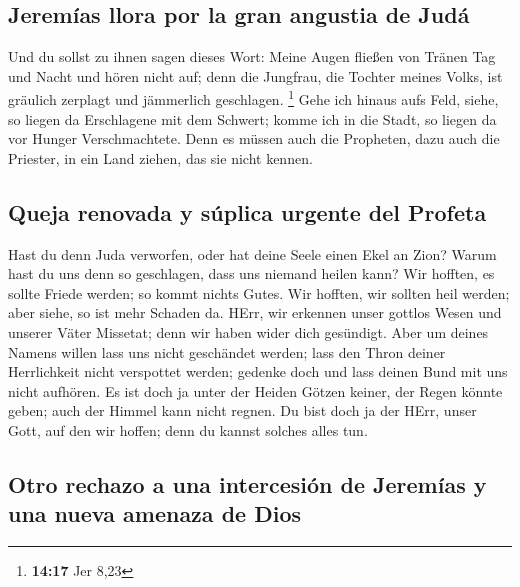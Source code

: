 \hypertarget{jeremuxedas-llora-por-la-gran-angustia-de-juduxe1}{%
\subsection{Jeremías llora por la gran angustia de
Judá}\label{jeremuxedas-llora-por-la-gran-angustia-de-juduxe1}}

 Und du sollst zu ihnen sagen dieses Wort: Meine Augen
fließen von Tränen Tag und Nacht und hören nicht auf; denn die Jungfrau,
die Tochter meines Volks, ist gräulich zerplagt und jämmerlich
geschlagen. \footnote{\textbf{14:17} Jer 8,23}  Gehe ich
hinaus aufs Feld, siehe, so liegen da Erschlagene mit dem Schwert; komme
ich in die Stadt, so liegen da vor Hunger Verschmachtete. Denn es müssen
auch die Propheten, dazu auch die Priester, in ein Land ziehen, das sie
nicht kennen.

\hypertarget{queja-renovada-y-suxfaplica-urgente-del-profeta}{%
\subsection{Queja renovada y súplica urgente del
Profeta}\label{queja-renovada-y-suxfaplica-urgente-del-profeta}}

 Hast du denn Juda verworfen, oder hat deine Seele einen
Ekel an Zion? Warum hast du uns denn so geschlagen, dass uns niemand
heilen kann? Wir hofften, es sollte Friede werden; so kommt nichts
Gutes. Wir hofften, wir sollten heil werden; aber siehe, so ist mehr
Schaden da.  HErr, wir erkennen unser gottlos Wesen und
unserer Väter Missetat; denn wir haben wider dich gesündigt.
 Aber um deines Namens willen lass uns nicht geschändet
werden; lass den Thron deiner Herrlichkeit nicht verspottet werden;
gedenke doch und lass deinen Bund mit uns nicht aufhören.
 Es ist doch ja unter der Heiden Götzen keiner, der Regen
könnte geben; auch der Himmel kann nicht regnen. Du bist doch ja der
HErr, unser Gott, auf den wir hoffen; denn du kannst solches alles tun.

\hypertarget{otro-rechazo-a-una-intercesiuxf3n-de-jeremuxedas-y-una-nueva-amenaza-de-dios}{%
\subsection{Otro rechazo a una intercesión de Jeremías y una nueva
amenaza de
Dios}\label{otro-rechazo-a-una-intercesiuxf3n-de-jeremuxedas-y-una-nueva-amenaza-de-dios}}

